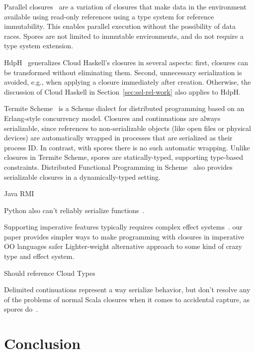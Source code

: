 \documentclass{llncs}
\begin{document}
Parallel closures~\cite{ParallelClosures} are a variation of closures that make data in the environment available using read-only references using a type system for reference immutability. This enables parallel execution without the possibility of data races. Spores are not limited to immutable environments, and do not require a type system extension.

HdpH~\cite{HDPH} generalizes Cloud Haskell's closures in several aspects: first, closures can be transformed without eliminating them. Second, unnecessary serialization is avoided, e.g., when applying a closure immediately after creation. Otherwise, the discussion of Cloud Haskell in Section~\ref{sec:sel-rel-work} also applies to HdpH.

Termite Scheme~\cite{Termite} is a Scheme dialect for distributed programming based on an Erlang-style concurrency model. Closures and continuations are always serializable, since references to non-serializable objects (like open files or physical devices) are automatically wrapped in processes that are serialized as their process ID. In contrast, with spores there is no such automatic wrapping. Unlike closures in Termite Scheme, spores are statically-typed, supporting type-based constraints. Distributed Functional Programming in Scheme~\cite{DFPS} also provides serializable closures in a dynamically-typed setting.

Java RMI~\cite{JavaRMI}

Python also can't reliably serialize functions~\cite{PythonPickle}.

Supporting imperative features typically requires complex effect systems~\cite{DPJ}. our paper provides simpler ways to make programming with closures in imperative OO languages safer
Lighter-weight alternative approach to some kind of crazy type and effect system.

Should reference Cloud Types~\cite{CloudTypes}

Delimited continuations represent a way serialize behavior, but don't resolve
any of the problems of normal Scala closures when it comes to accidental
capture, as spores do~\cite{DelimitedContinuations}.

\section{Conclusion}
\label{sec:conclusion}



\end{document}
